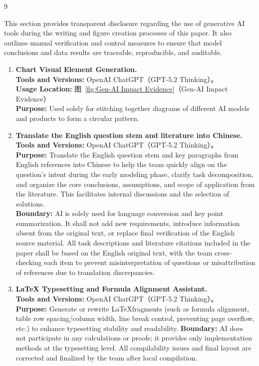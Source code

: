 \documentclass{mcmthesis}
\begin{document}
\begin{ReportAiUse}{9}

This section provides transparent disclosure regarding the use of generative AI tools during the writing and figure creation processes of this paper. It also outlines manual verification and control measures to ensure that model conclusions and data results are traceable, reproducible, and auditable.

\begin{enumerate}
\item \textbf{Chart Visual Element Generation.}\\
\textbf{Tools and Versions:} OpenAI ChatGPT（GPT-5.2 Thinking）。\\
\textbf{Usage Location:} 图~\ref{fig:Gen-AI Impact Evidence}（Gen-AI Impact Evidence）\\
\textbf{Purpose:} Used solely for stitching together diagrams of different AI models and products to form a circular pattern.\\


\item \textbf{Translate the English question stem and literature into Chinese.}\\
\textbf{Tools and Versions:} OpenAI ChatGPT（GPT-5.2 Thinking）。\\
\textbf{Purpose:} Translate the English question stem and key paragraphs from English references into Chinese to help the team quickly align on the question's intent during the early modeling phase, clarify task decomposition, and organize the core conclusions, assumptions, and scope of application from the literature. This facilitates internal discussions and the selection of solutions. \\
\textbf{Boundary:} AI is solely used for language conversion and key point summarization. It shall not add new requirements, introduce information absent from the original text, or replace final verification of the English source material. All task descriptions and literature citations included in the paper shall be based on the English original text, with the team cross-checking each item to prevent misinterpretation of questions or misattribution of references due to translation discrepancies.


\item \textbf{LaTeX Typesetting and Formula Alignment Assistant.}\\
\textbf{Tools and Versions:} OpenAI ChatGPT（GPT-5.2 Thinking）。\\
\textbf{Purpose:} Generate or rewrite \LaTeX fragments (such as formula alignment, table row spacing/column width, line break control, preventing page overflow, etc.) to enhance typesetting stability and readability.
\textbf{Boundary:} AI does not participate in any calculations or proofs; it provides only implementation methods at the typesetting level. All compilability issues and final layout are corrected and finalized by the team after local compilation.




\end{enumerate}
\end{ReportAiUse}
\end{document}
